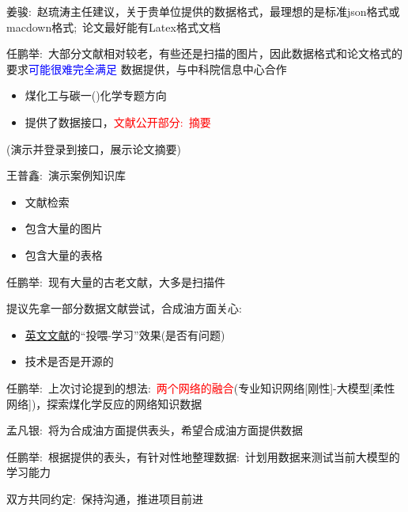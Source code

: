 {姜骏}:~赵琉涛主任建议，关于贵单位提供的数据格式，最理想的是标准\textrm{json}格式或\textrm{macdown}格式;~论文最好能有\textrm{Latex}格式文档

{任鹏举}:~大部分文献相对较老，有些还是扫描的图片，因此数据格式和论文格式的要求\textcolor{blue}{可能很难完全满足}
\vskip 3pt
数据提供，与中科院信息中心合作
\begin{itemize}
	\item 煤化工与碳一\textrm{()}化学专题方向
	\item 提供了数据接口，\textcolor{red}{文献公开部分:~摘要}
\end{itemize}
\textrm{(演示并登录到接口，展示论文摘要)}

{王普鑫}:~演示案例知识库
\begin{itemize}
	\item 文献检索
	\item 包含大量的图片
	\item 包含大量的表格
\end{itemize}

{任鹏举}:~现有大量的古老文献，大多是扫描件

提议先拿一部分数据文献尝试，合成油方面关心:
\begin{itemize}
	\item \underline{英文文献}的``投喂-学习''效果(是否有问题)
	\item 技术是否是开源的
\end{itemize}

{任鹏举}:~上次讨论提到的想法:~\textcolor{red}{两个网络的融合}(专业知识网络[刚性]-大模型[柔性网络])，探索煤化学反应的网络知识数据
		
{孟凡银}:~将为合成油方面提供表头，希望合成油方面提供数据

{任鹏举}:~根据提供的表头，有针对性地整理数据:~计划用数据来测试当前大模型的学习能力


双方共同约定:~保持沟通，推进项目前进
